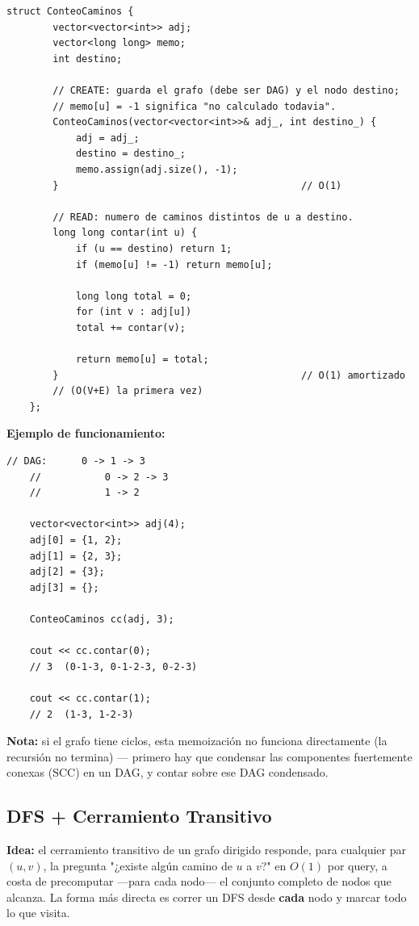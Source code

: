 \documentclass[10pt,a4paper,twocolumn]{article}
\begin{document}
\begin{lstlisting}[style=cpp]
	struct ConteoCaminos {
		vector<vector<int>> adj;
		vector<long long> memo;
		int destino;
		
		// CREATE: guarda el grafo (debe ser DAG) y el nodo destino;
		// memo[u] = -1 significa "no calculado todavia".
		ConteoCaminos(vector<vector<int>>& adj_, int destino_) {
			adj = adj_;
			destino = destino_;
			memo.assign(adj.size(), -1);
		}                                          // O(1)
		
		// READ: numero de caminos distintos de u a destino.
		long long contar(int u) {
			if (u == destino) return 1;
			if (memo[u] != -1) return memo[u];
			
			long long total = 0;
			for (int v : adj[u])
			total += contar(v);
			
			return memo[u] = total;
		}                                          // O(1) amortizado
		// (O(V+E) la primera vez)
	};
\end{lstlisting}

\textbf{Ejemplo de funcionamiento:}

\begin{lstlisting}[style=cpp]
	// DAG:      0 -> 1 -> 3
	//           0 -> 2 -> 3
	//           1 -> 2
	
	vector<vector<int>> adj(4);
	adj[0] = {1, 2};
	adj[1] = {2, 3};
	adj[2] = {3};
	adj[3] = {};
	
	ConteoCaminos cc(adj, 3);
	
	cout << cc.contar(0);
	// 3  (0-1-3, 0-1-2-3, 0-2-3)
	
	cout << cc.contar(1);
	// 2  (1-3, 1-2-3)
\end{lstlisting}

\textbf{Nota:} si el grafo tiene ciclos, esta memoización no funciona
directamente (la recursión no termina) — primero hay que condensar
las componentes fuertemente conexas (SCC) en un DAG, y contar sobre
ese DAG condensado.


\subsection{DFS + Cerramiento Transitivo}

\textbf{Idea:} el cerramiento transitivo de un grafo dirigido
responde, para cualquier par $(u,v)$, la pregunta "¿existe algún
camino de $u$ a $v$?" en $O(1)$ por query, a costa de precomputar
—para cada nodo— el conjunto completo de nodos que alcanza. La forma
más directa es correr un DFS desde \textbf{cada} nodo y marcar todo
lo que visita.
\end{document}

